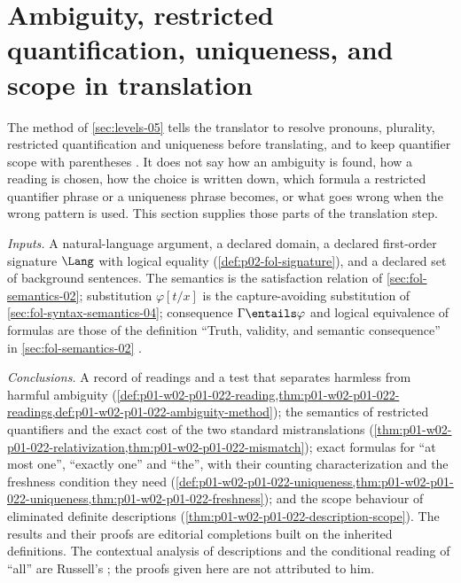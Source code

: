 \section{Ambiguity, restricted quantification, uniqueness, and scope in translation}
\label{sec:p01-w02-p01-022-translation}

The method of \cref{sec:levels-05} tells the translator to resolve pronouns,
plurality, restricted quantification and uniqueness before translating, and
to keep quantifier scope with parentheses
\cite[ch.~``Levels, Objects, and Consequence'', sec.~``Arguments and
formalization'', method ``Formalizing an argument'']{FrozenFormalLogicFormalizing}.
It does not say how an ambiguity is found, how a reading is chosen, how the
choice is written down, which formula a restricted quantifier phrase or a
uniqueness phrase becomes, or what goes wrong when the wrong pattern is used.
This section supplies those parts of the translation step.

\emph{Inputs.} A natural-language argument, a declared domain, a declared
first-order signature \(\Lang\) with logical equality
(\cref{def:p02-fol-signature}), and a declared set of background sentences.
The semantics is the satisfaction relation of \cref{sec:fol-semantics-02};
substitution \(\varphi[t/x]\) is the capture-avoiding substitution of
\cref{sec:fol-syntax-semantics-04}; consequence \(\Gamma\entails\varphi\) and
logical equivalence of formulas are those of the definition ``Truth,
validity, and semantic consequence'' in \cref{sec:fol-semantics-02}
\cite[ch.~``Structures, Satisfaction, and Translation'', secs.~``Satisfaction''
and ``Translation with quantifiers'']{FrozenFormalLogicFormalizing}.

\emph{Conclusions.} A record of readings and a test that separates harmless
from harmful ambiguity (\cref{def:p01-w02-p01-022-reading,thm:p01-w02-p01-022-readings,def:p01-w02-p01-022-ambiguity-method}); the
semantics of restricted quantifiers and the exact cost of the two standard
mistranslations (\cref{thm:p01-w02-p01-022-relativization,thm:p01-w02-p01-022-mismatch}); exact formulas for ``at most one'',
``exactly one'' and ``the'', with their counting characterization and the
freshness condition they need (\cref{def:p01-w02-p01-022-uniqueness,thm:p01-w02-p01-022-uniqueness,thm:p01-w02-p01-022-freshness}); and the
scope behaviour of eliminated definite descriptions
(\cref{thm:p01-w02-p01-022-description-scope}). The results and their proofs
are editorial completions built on the inherited definitions. The contextual
analysis of descriptions and the conditional reading of ``all'' are
Russell's \cite[481--482, 489--490]{Russell1905}; the proofs given here are
not attributed to him.

